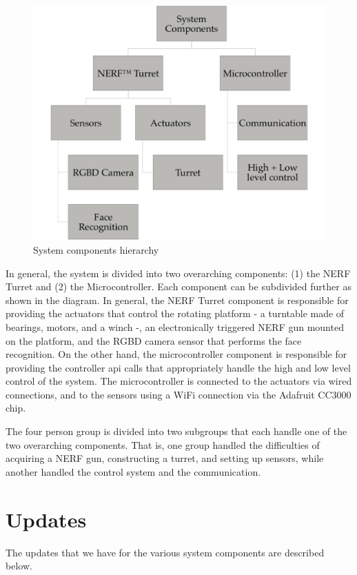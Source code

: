 \documentclass[journal]{IEEEtran}
\begin{document}
\begin{figure}[htbp]
    \centering
    \includegraphics[width=0.80\linewidth]{components.png}
    \caption{System components hierarchy}
    \label{fig:components}
\end{figure}

In general, the system is divided into two overarching components: (1) the NERF Turret and (2) the Microcontroller. Each component can be subdivided further as shown in the diagram. In general, the NERF Turret component is responsible for providing the actuators that control the rotating platform - a turntable made of bearings, motors, and a winch -, an electronically triggered NERF gun mounted on the platform, and the RGBD camera sensor that performs the face recognition. On the other hand, the microcontroller component is responsible for providing the controller api calls that appropriately handle the high and low level control of the system. The microcontroller is connected to the actuators via wired connections, and to the sensors using a WiFi connection via the Adafruit CC3000 chip.

The four person group is divided into two subgroups that each handle one of the two overarching components. That is, one group handled the difficulties of acquiring a NERF gun, constructing a turret, and setting up sensors, while another handled the control system and the communication.

\section{Updates}

The updates that we have for the various system components are described below.
\end{document}
